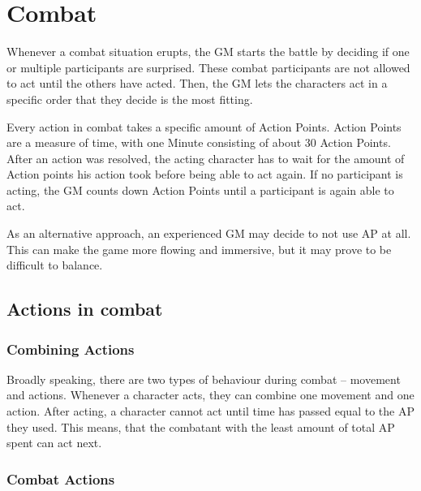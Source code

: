 \chapter{Combat}\label{ch:combat}
Whenever a combat situation erupts, the GM starts the battle by deciding if one or multiple participants are surprised.
These combat participants are not allowed to act until the others have acted.
Then, the GM lets the characters act in a specific order that they decide is the most fitting.

Every action in combat takes a specific amount of Action Points.
Action Points are a measure of time, with one Minute consisting of about 30 Action Points.
After an action was resolved, the acting character has to wait for the amount of Action points his action took before being able to act again.
If no participant is acting, the GM counts down Action Points until a participant is again able to act.

As an alternative approach, an experienced GM may decide to not use AP at all.
This can make the game more flowing and immersive, but it may prove to be difficult to balance.


\section{Actions in combat}\label{sec:combatActions}

\subsection{Combining Actions}\label{subsec:multipleCombatActions}

Broadly speaking, there are two types of behaviour during combat -- movement and actions.
Whenever a character acts, they can combine one movement and one action.
After acting, a character cannot act until time has passed equal to the AP they used.
This means, that the combatant with the least amount of total AP spent can act next.

\subsection{Combat Actions}\label{subsec:combatActions}

